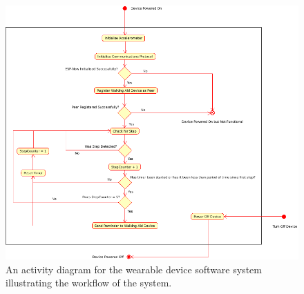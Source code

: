 \begin{figure}[H]
	\centering
	\captionsetup{width=1.0\linewidth}


	\includegraphics[width=1.0\linewidth]{./UML/WearableDevice/activity diagram.png}

	\caption[Wearable Device Activity Diagram]{An activity diagram for the wearable device software system illustrating the workflow of the system.}

	\label{fig:activity_diagram_wearable}

\end{figure}